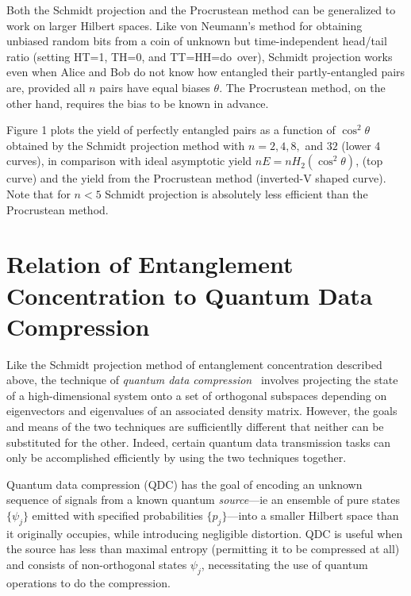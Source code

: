 Both the Schmidt projection and the Procrustean method
can be generalized to work on larger Hilbert spaces.
Like von Neumann's method for obtaining unbiased random bits from
a coin of unknown but time-independent head/tail ratio
(setting HT=1, TH=0, and TT=HH=\mbox{do over}),
Schmidt projection works even when Alice and Bob do not know how
entangled their partly-entangled pairs are, provided all $n$
pairs have equal biases $\theta$.  The Procrustean method, on the
other hand, requires the bias to be known in advance.
 
Figure 1 plots the yield of perfectly entangled pairs
as a function of $\cos^2\theta$ obtained by the Schmidt projection method
with $n=2,4,8,$ and $32$ (lower 4 curves), in comparison with
ideal asymptotic yield $nE=nH_2(\cos^2\theta)$, (top curve) and the
yield from the Procrustean method (inverted-V shaped curve).
Note that for $n<5$ Schmidt projection is absolutely less
efficient than the Procrustean method.
 
 
\section{Relation of Entanglement Concentration to Quantum
Data Compression}
 
Like the Schmidt projection method of entanglement concentration
described above, the technique of {\sl quantum data
compression\/}~\cite{JS94,Schu95} involves projecting the state of a
high-dimensional system onto a set of orthogonal subspaces depending on
eigenvectors and eigenvalues of an associated density matrix.  However,
the goals and means of the two techniques are sufficientlly different
that neither can be substituted for the other. Indeed, certain quantum
data transmission tasks can only be accomplished efficiently by using
the two techniques together.
 
Quantum data compression (QDC) has the goal of encoding an unknown
sequence of signals from a known quantum {\sl source\/}---ie an ensemble
of pure states $\{\psi_j\}$ emitted with specified probabilities
$\{p_j\}$---into a smaller Hilbert space than it originally occupies,
while introducing negligible distortion.  QDC is useful when the source
has less than maximal entropy (permitting it to be compressed at all) and
consists of non-orthogonal states $\psi_j$, necessitating the use of
quantum operations to do the compression.
 
